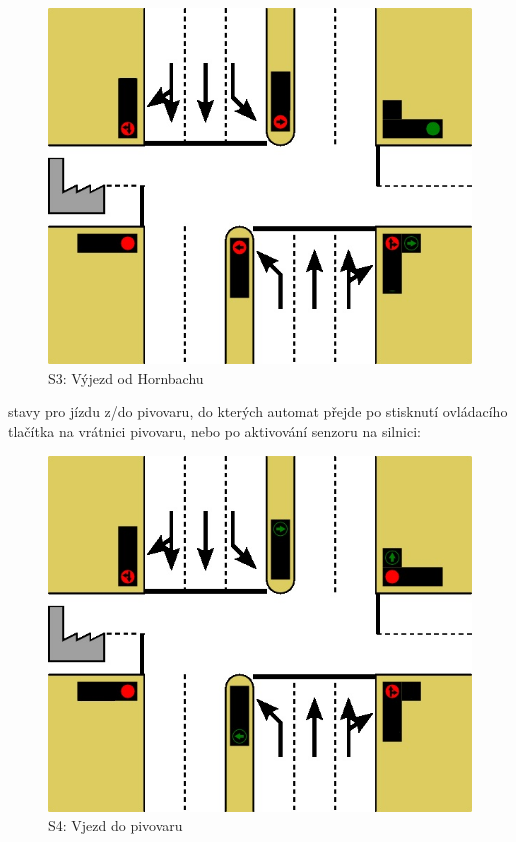 \documentclass[12pt, a4paper]{report}
\begin{document}
\begin{figure}[!h]
	\centering
		\includegraphics{image/S3_krizovatka.jpg}
	\caption{S3: Výjezd od Hornbachu}
	\label{fig:S3_krizovatka}
\end{figure}

\clearpage

 stavy pro jízdu z/do pivovaru, do kterých automat přejde po stisknutí ovládacího tlačítka na vrátnici pivovaru, nebo po aktivování senzoru na silnici:

\begin{figure}[!h]
	\centering
		\includegraphics{image/S4_krizovatka.jpg}
	\caption{S4: Vjezd do pivovaru}
	\label{fig:S4_krizovatka}
\end{figure}
\end{document}

